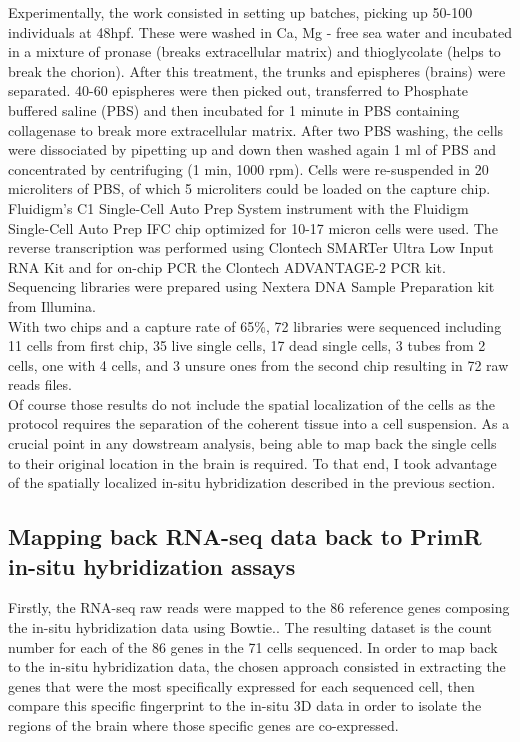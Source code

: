 	Experimentally, the work consisted in setting up \platy{} batches, picking up 50-100 individuals at 48hpf. These were washed in Ca, Mg - free sea water and incubated in a mixture of pronase (breaks extracellular matrix) and thioglycolate (helps to break the chorion). After this treatment, the trunks and epispheres (brains) were separated. 40-60 epispheres were then picked out, transferred to Phosphate buffered saline (PBS) and then incubated for 1 minute in PBS containing collagenase to break more extracellular matrix. After two PBS washing, the cells were dissociated by pipetting up and down then washed again 1 ml of PBS and concentrated by centrifuging (1 min, 1000 rpm). Cells were re-suspended in 20 microliters of PBS, of which 5 microliters could be loaded on the capture chip.\\

	Fluidigm's C1 Single-Cell Auto Prep System instrument with the Fluidigm Single-Cell Auto Prep IFC chip optimized for 10-17 micron cells were used. The reverse transcription was performed using Clontech SMARTer Ultra Low Input RNA Kit and for on-chip PCR the Clontech ADVANTAGE-2 PCR kit. Sequencing libraries were prepared using Nextera DNA Sample Preparation kit from Illumina.\\

	With two chips and a capture rate of 65\%, 72 libraries were sequenced including 11 cells from first chip, 35 live single cells, 17 dead single cells, 3 tubes from 2 cells, one with 4 cells, and 3 unsure ones from the second chip resulting in 72 raw reads files.\\	
  	
	Of course those results do not include the spatial localization of the cells as the protocol requires the separation of the coherent tissue into a cell suspension. As a crucial point in any dowstream analysis, being able to map back the single cells to their original location in the brain is required. To that end, I took advantage of the spatially localized in-situ hybridization described in the previous section.\\

  \subsection{Mapping back RNA-seq data back to PrimR in-situ hybridization assays}
  	Firstly, the RNA-seq raw reads were mapped to the 86 reference genes composing the in-situ hybridization data using Bowtie.. The resulting dataset is the count number for each of the 86 genes in the 71 cells sequenced. In order to map back to the in-situ hybridization data, the chosen approach consisted in extracting the genes that were the most specifically expressed for each sequenced cell, then compare this specific fingerprint to the in-situ 3D data in order to isolate the regions of the brain where those specific genes are co-expressed.\\
	
